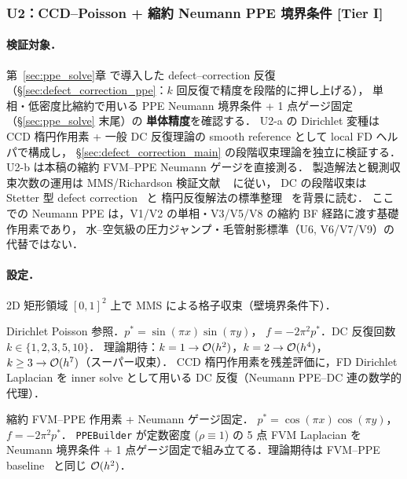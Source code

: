 %
\subsubsection{U2：CCD--Poisson + 縮約 Neumann PPE 境界条件 [Tier I]}
\label{sec:U2_ccd_poisson_ppe_bc}

\paragraph{検証対象．}
第~\ref{sec:ppe_solve}章 で導入した defect--correction 反復
（§\ref{sec:defect_correction_ppe}：$k$ 回反復で精度を段階的に押し上げる），
単相・低密度比縮約で用いる PPE Neumann 境界条件 + 1 点ゲージ固定（§\ref{sec:ppe_solve} 末尾）の
\textbf{単体精度}を確認する．
U2-a の Dirichlet 変種は CCD 楕円作用素 + 一般 DC 反復理論の
smooth reference として local FD ヘルパで構成し，
§\ref{sec:defect_correction_main} の段階収束理論を独立に検証する．
U2-b は本稿の縮約 FVM--PPE Neumann ゲージを直接測る．
製造解法と観測収束次数の運用は MMS/Richardson 検証文献
~\cite{Roache2002,SalariKnupp2000,Roy2003} に従い，
DC の段階収束は Stetter 型 defect correction~\cite{Stetter1978} と
楕円反復解法の標準整理~\cite{Kelley2003} を背景に読む．
ここでの Neumann PPE は，V1/V2 の単相・V3/V5/V8 の縮約 BF 経路に渡す基礎作用素であり，
水--空気級の圧力ジャンプ・毛管射影標準（U6, V6/V7/V9）の代替ではない．

\paragraph{設定．}
2D 矩形領域 $[0,1]^2$ 上で MMS による格子収束（壁境界条件下）．
\begin{description}\setlength{\itemsep}{0pt}
  \item[U2-a] Dirichlet Poisson 参照．$p^* = \sin(\pi x) \sin(\pi y)$，
        $f = -2\pi^2 p^*$．DC 反復回数 $k \in \{1,2,3,5,10\}$．
        理論期待：$k=1 \to \mathcal{O}(h^2)$，$k=2 \to \mathcal{O}(h^4)$，
        $k \ge 3 \to \mathcal{O}(h^7)$（スーパー収束）．
        CCD 楕円作用素を残差評価に，FD Dirichlet Laplacian を inner solve
        として用いる DC 反復（Neumann PPE--DC 連の数学的代理）．
  \item[U2-b] 縮約 FVM--PPE 作用素 + Neumann ゲージ固定．
        $p^* = \cos(\pi x)\cos(\pi y)$，$f = -2\pi^2 p^*$．
        \texttt{PPEBuilder} が定数密度 ($\rho\!\equiv\!1$) の 5 点 FVM Laplacian を
        Neumann 境界条件 + 1 点ゲージ固定で組み立てる．理論期待は
        FVM--PPE baseline~\cite{Patankar1980,BellColella1989} と同じ $\mathcal{O}(h^2)$．
\end{description}

